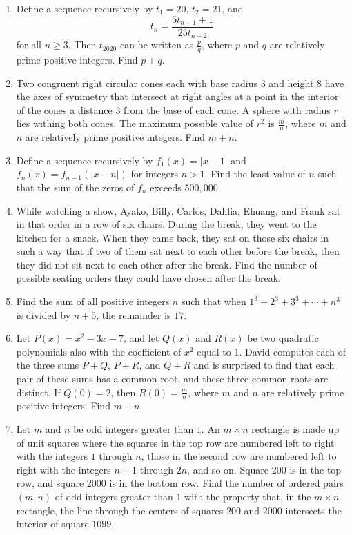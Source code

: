 \documentclass{article}%
\begin{document}
\begin{enumerate}
%
\item%
[\textbf{Problem 6}]Define a sequence recursively by $t_1 = 20$, $t_2 = 21$, and\[t_n = \frac{5t_{n-1}+1}{25t_{n-2}}\]for all $n \ge 3$. Then $t_{2020}$ can be written as $\frac{p}{q}$, where $p$ and $q$ are relatively prime positive integers. Find $p+q$.
%
\item%
[\textbf{Problem 7}]Two congruent right circular cones each with base radius $3$ and height $8$ have the axes of symmetry that intersect at right angles at a point in the interior of the cones a distance $3$ from the base of each cone. A sphere with radius $r$ lies withing both cones. The maximum possible value of $r^2$ is $\frac{m}{n}$, where $m$ and $n$ are relatively prime positive integers. Find $m+n$.
%
\item%
[\textbf{Problem 8}]Define a sequence recursively by $f_1(x)=|x-1|$ and $f_n(x)=f_{n-1}(|x-n|)$ for integers $n>1$. Find the least value of $n$ such that the sum of the zeros of $f_n$ exceeds $500,000$.
%
\item%
[\textbf{Problem 9}]While watching a show, Ayako, Billy, Carlos, Dahlia, Ehuang, and Frank sat in that order in a row of six chairs. During the break, they went to the kitchen for a snack. When they came back, they sat on those six chairs in such a way that if two of them sat next to each other before the break, then they did not sit next to each other after the break. Find the number of possible seating orders they could have chosen after the break.
%
\item%
[\textbf{Problem 10}]Find the sum of all positive integers $n$ such that when $1^3+2^3+3^3+\cdots +n^3$ is divided by $n+5$, the remainder is $17$.
%
\item%
[\textbf{Problem 11}]Let $P(x) = x^2 - 3x - 7$, and let $Q(x)$ and $R(x)$ be two quadratic polynomials also with the coefficient of $x^2$ equal to $1$. David computes each of the three sums $P + Q$, $P + R$, and $Q + R$ and is surprised to find that each pair of these sums has a common root, and these three common roots are distinct. If $Q(0) = 2$, then $R(0) = \frac{m}{n}$, where $m$ and $n$ are relatively prime positive integers. Find $m + n$.
%
\item%
[\textbf{Problem 12}]Let $m$ and $n$ be odd integers greater than $1.$ An $m\times n$ rectangle is made up of unit squares where the squares in the top row are numbered left to right with the integers $1$ through $n$, those in the second row are numbered left to right with the integers $n + 1$ through $2n$, and so on. Square $200$ is in the top row, and square $2000$ is in the bottom row. Find the number of ordered pairs $(m,n)$ of odd integers greater than $1$ with the property that, in the $m\times n$ rectangle, the line through the centers of squares $200$ and $2000$ intersects the interior of square $1099$.

\end{enumerate}
\end{document}

